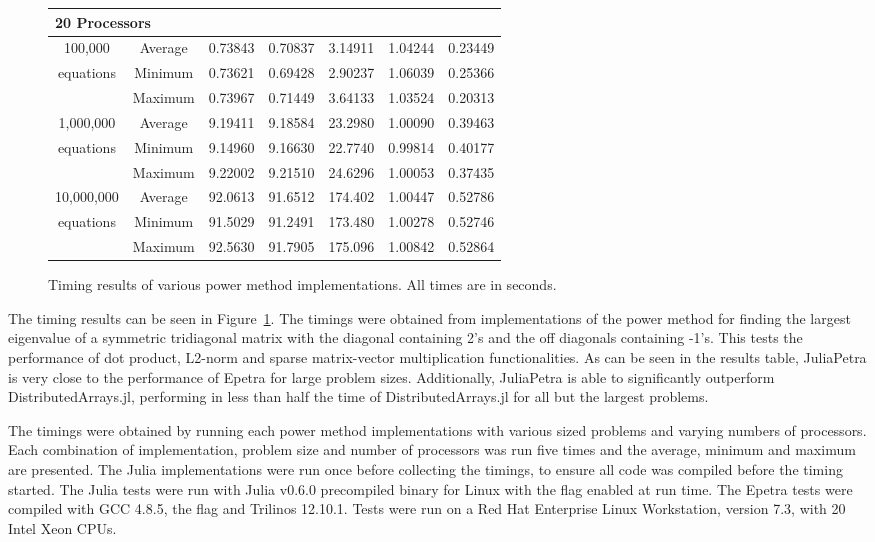 \documentclass[acmsmall]{acmart}
\newcommand{\juliaSnippet}[1]{\texttt{\detokenize{#1}}}
\begin{document}
\begin{figure}
\begin{tabular}{|c c|r|r|r||r|r|}
	\hline
			\multicolumn{7}{|l|}{20 Processors}\\
	\hline
		100,000			&Average & 0.73843 & 0.70837 & 3.14911 & 1.04244 & 0.23449 \\
		equations		&Minimum & 0.73621 & 0.69428 & 2.90237 & 1.06039 & 0.25366 \\
						&Maximum & 0.73967 & 0.71449 & 3.64133 & 1.03524 & 0.20313 \\
	\hline
		1,000,000		&Average & 9.19411 & 9.18584 & 23.2980 & 1.00090 & 0.39463 \\
		equations		&Minimum & 9.14960 & 9.16630 & 22.7740 & 0.99814 & 0.40177 \\
						&Maximum & 9.22002 & 9.21510 & 24.6296 & 1.00053 & 0.37435 \\
	\hline
		10,000,000		&Average & 92.0613 & 91.6512 & 174.402 & 1.00447 & 0.52786 \\
		equations		&Minimum & 91.5029 & 91.2491 & 173.480 & 1.00278 & 0.52746 \\
						&Maximum & 92.5630 & 91.7905 & 175.096 & 1.00842 & 0.52864 \\
	\hline
\end{tabular}

\caption{Timing results of various power method implementations.  All times are in seconds.}
\label{fig:timing-results}
\end{figure}

The timing results can be seen in Figure~\ref{fig:timing-results}.
The timings were obtained from implementations of the power method for finding the largest eigenvalue
of a symmetric tridiagonal matrix with the diagonal containing 2's and the off diagonals containing -1's.
\cite{PowerMethod}
This tests the performance of dot product, L2-norm and sparse matrix-vector multiplication functionalities.
As can be seen in the results table, JuliaPetra is very close to the performance
of Epetra for large problem sizes.
Additionally, JuliaPetra is able to significantly outperform DistributedArrays.jl, performing in less than
half the time of DistributedArrays.jl for all but the largest problems.

The timings were obtained by running each power method implementations
with various sized problems and varying numbers of processors.
Each combination of implementation, problem size and number of processors was run five times
and the average, minimum and maximum are presented.
The Julia implementations were run once before collecting the timings, to ensure all code was
compiled before the timing started.
The Julia tests were run with Julia v0.6.0 precompiled binary for Linux
with the \juliaSnippet{-O3} flag enabled at run time.
The Epetra tests were compiled with GCC 4.8.5, the \juliaSnippet{-O3} flag and Trilinos 12.10.1.
Tests were run on a Red Hat Enterprise Linux Workstation, version 7.3,
with 20 Intel Xeon CPUs.
\end{document}
